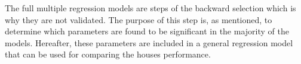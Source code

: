 \noindent The full multiple regression models are steps of the backward selection which is why they are not validated. The purpose of this step is, as mentioned, to determine which parameters are found to be significant in the majority of the models. Hereafter, these parameters are included in a general regression model that can be used for comparing the houses performance.






